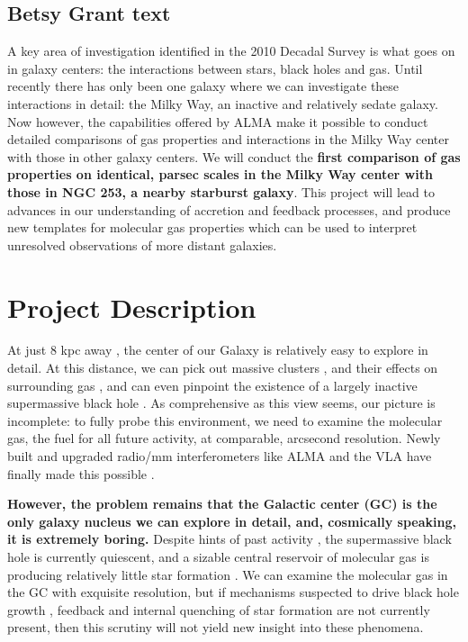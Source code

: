 \documentclass{aastex62}
\begin{document}
\subsection{Betsy Grant text}
 A key area of investigation identified in the 2010 Decadal Survey is what goes on in galaxy centers: the interactions between stars, black holes and gas. Until recently there has only been one galaxy where we can investigate these interactions in detail: the Milky Way, an inactive and relatively sedate galaxy. Now however, the capabilities offered by ALMA make it possible to conduct detailed comparisons of gas properties and interactions in the Milky Way center with those in other galaxy centers. We will conduct the {\bf first comparison of gas properties on identical, parsec scales in the Milky Way center with those in NGC 253, a nearby starburst galaxy}. This project will lead to advances in our understanding of accretion and feedback processes, and produce new templates for molecular gas properties which can be used to interpret unresolved observations of more distant galaxies. 
\section{Project Description}  

At just 8 kpc away \citep{Boehle16a}, the center of our Galaxy is relatively easy to explore in detail. At this distance, we can pick out massive clusters \citep{Clarkson12a,Hussmann12,Lu13}, and their effects on surrounding gas \citep{Lang97,Lang01}, and can even pinpoint the existence of a largely inactive supermassive black hole \citep{Genzel96,Genzel97,Ghez98,Ghez08}. As comprehensive as this view seems, our picture is incomplete: to fully probe this environment, we need to examine the molecular gas, the fuel for all future activity, at comparable, arcsecond resolution. Newly built and upgraded radio/mm interferometers like ALMA and the VLA have finally made this possible \citep[e.g.,][]{Mills15, Rathborne15, Battersby17}. 

{\bf However, the problem remains that the Galactic center (GC) is the only galaxy nucleus we can explore in detail, and, cosmically speaking, it is extremely boring.} Despite hints of past activity \citep{Ponti10,SSF10,SF12}, the supermassive black hole is currently quiescent, and a sizable central reservoir of molecular gas is producing relatively little star formation \citep{Longmore13}. We can examine the molecular gas in the GC with exquisite resolution, but if mechanisms suspected to drive black hole growth \citep[through active accretion from a `torus';][]{LB69,Netzer15}, feedback and internal quenching of star formation \citep[either from star formation itself or AGN;][]{DS12,DM05} are not currently present, then this scrutiny will not yield new insight into these phenomena. %
\end{document}
